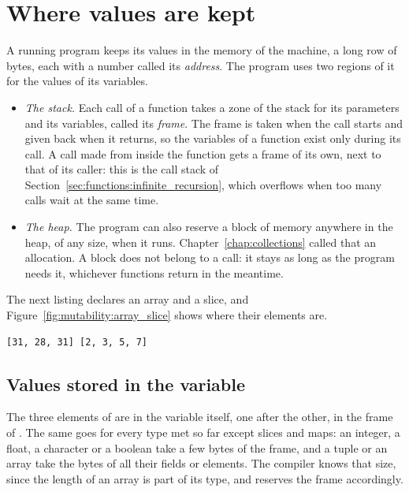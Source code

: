 \vfill\pagebreak
\section{Where values are kept}
\label{sec:mutability:stack_heap}

A running program keeps its values in the memory of the machine, a long row of
bytes, each with a number called its \textit{address}. The program uses two
regions of it for the values of its variables.

\begin{itemize}
\item \textit{The stack.} Each call of a function takes a zone of the stack for
  its parameters and its variables, called its \textit{frame}. The frame is
  taken when the call starts and given back when it returns, so the variables
  of a function exist only during its call. A call made from inside the
  function gets a frame of its own, next to that of its caller: this is the
  call stack of Section~\ref{sec:functions:infinite_recursion}, which
  overflows when too many calls wait at the same time.
\item \textit{The heap.} The program can also reserve a block of memory
  anywhere in the heap, of any size, when it runs. Chapter~\ref{chap:collections}
  called that an allocation. A block does not belong to a call: it stays as long
  as the program needs it, whichever functions return in the meantime.
\end{itemize}

The next listing declares an array and a slice, and
Figure~\ref{fig:mutability:array_slice} shows where their elements are.


\vspace{-10pt}%
\begin{lstlisting}[style=bashVerb]
[31, 28, 31] [2, 3, 5, 7]
\end{lstlisting}



\subsection{Values stored in the variable}

The three elements of  are in the variable itself, one after the
other, in the frame of . The same goes for every type met so far
except slices and maps: an integer, a float, a character or a boolean take a few
bytes of the frame, and a tuple or an array take the bytes of all their fields
or elements. The compiler knows that size, since the length of an array is part
of its type, and reserves the frame accordingly.

